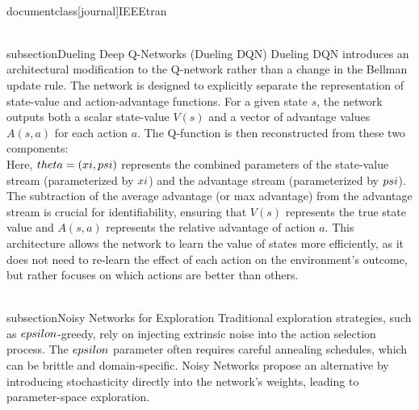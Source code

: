 \\documentclass[journal]{IEEEtran}
\begin{document}
\\subsection{Dueling Deep Q-Networks (Dueling DQN)}
Dueling DQN \cite{wang2016dueling} introduces an architectural modification to the Q-network rather than a change in the Bellman update rule. The network is designed to explicitly separate the representation of state-value and action-advantage functions. For a given state $s$, the network outputs both a scalar state-value $V(s)$ and a vector of advantage values $A(s, a)$ for each action $a$.
The Q-function is then reconstructed from these two components:
\\[
Q(s, a; \\theta) = V(s; \\xi) + \\left( A(s, a; \\psi) - \\frac{1}{|\\mathcal{A}|} \\sum_{a\'} A(s, a\'; \\psi) \\right)
\\]
Here, $\\theta = (\\xi, \\psi)$ represents the combined parameters of the state-value stream (parameterized by $\\xi$) and the advantage stream (parameterized by $\\psi$). The subtraction of the average advantage (or max advantage) from the advantage stream is crucial for identifiability, ensuring that $V(s)$ represents the true state value and $A(s, a)$ represents the relative advantage of action $a$. This architecture allows the network to learn the value of states more efficiently, as it does not need to re-learn the effect of each action on the environment's outcome, but rather focuses on which actions are better than others.

\\subsection{Noisy Networks for Exploration}
Traditional exploration strategies, such as $\\epsilon$-greedy, rely on injecting extrinsic noise into the action selection process. The $\\epsilon$ parameter often requires careful annealing schedules, which can be brittle and domain-specific. Noisy Networks \cite{fortunato2017noisy} propose an alternative by introducing stochasticity directly into the network's weights, leading to parameter-space exploration.
\end{document}

